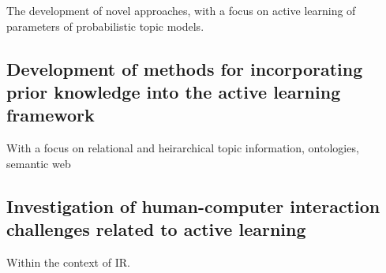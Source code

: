 \documentclass[a4paper, 11pt]{article}
\begin{document}
The development of novel approaches, with a focus on active learning of parameters of probabilistic topic models.

\subsection{Development of methods for incorporating prior knowledge into the active learning framework}

With a focus on relational and heirarchical topic information, ontologies, semantic web

\subsection{Investigation of human-computer interaction challenges related to active learning}

Within the context of IR.
\end{document}
